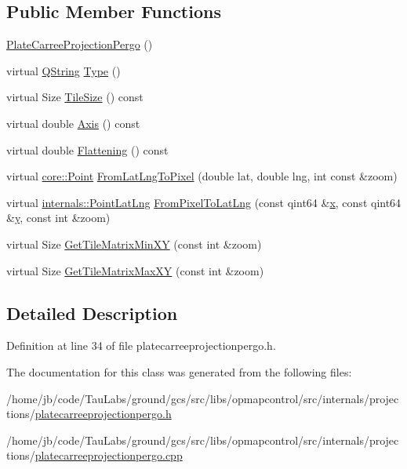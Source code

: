 \subsection*{\-Public \-Member \-Functions}
\begin{DoxyCompactItemize}
\item 
\hyperlink{group___o_p_map_widget_ga9efefe0ffe073b3074b5ada1a6f0f267}{\-Plate\-Carree\-Projection\-Pergo} ()
\item 
virtual \hyperlink{group___u_a_v_objects_plugin_gab9d252f49c333c94a72f97ce3105a32d}{\-Q\-String} \hyperlink{group___o_p_map_widget_ga0c0b83ba2e36423002e0561797a75d6f}{\-Type} ()
\item 
virtual \-Size \hyperlink{group___o_p_map_widget_ga459271797b70ca4aacc1bc616c8588e1}{\-Tile\-Size} () const 
\item 
virtual double \hyperlink{group___o_p_map_widget_ga189bc30528175596e1010dae2d199d1d}{\-Axis} () const 
\item 
virtual double \hyperlink{group___o_p_map_widget_ga03c9086ef72e6a349a5ab125cfd6533e}{\-Flattening} () const 
\item 
virtual \hyperlink{structcore_1_1_point}{core\-::\-Point} \hyperlink{group___o_p_map_widget_gaf785f752ac316a8cb94c96dacabdc244}{\-From\-Lat\-Lng\-To\-Pixel} (double lat, double lng, int const \&zoom)
\item 
virtual \hyperlink{structinternals_1_1_point_lat_lng}{internals\-::\-Point\-Lat\-Lng} \hyperlink{group___o_p_map_widget_ga3bd1d9693dd54a69baa88bed4785311d}{\-From\-Pixel\-To\-Lat\-Lng} (const qint64 \&\hyperlink{_o_p_plots_8m_a9336ebf25087d91c818ee6e9ec29f8c1}{x}, const qint64 \&\hyperlink{_o_p_plots_8m_a2fb1c5cf58867b5bbc9a1b145a86f3a0}{y}, const int \&zoom)
\item 
virtual \-Size \hyperlink{group___o_p_map_widget_ga95a4e9e98cce1bb7cc3d4afb9e30f1b7}{\-Get\-Tile\-Matrix\-Min\-X\-Y} (const int \&zoom)
\item 
virtual \-Size \hyperlink{group___o_p_map_widget_gabf54183dc66f5385ffa794ce7120629c}{\-Get\-Tile\-Matrix\-Max\-X\-Y} (const int \&zoom)
\end{DoxyCompactItemize}


\subsection{\-Detailed \-Description}


\-Definition at line 34 of file platecarreeprojectionpergo.\-h.



\-The documentation for this class was generated from the following files\-:\begin{DoxyCompactItemize}
\item 
/home/jb/code/\-Tau\-Labs/ground/gcs/src/libs/opmapcontrol/src/internals/projections/\hyperlink{platecarreeprojectionpergo_8h}{platecarreeprojectionpergo.\-h}\item 
/home/jb/code/\-Tau\-Labs/ground/gcs/src/libs/opmapcontrol/src/internals/projections/\hyperlink{platecarreeprojectionpergo_8cpp}{platecarreeprojectionpergo.\-cpp}\end{DoxyCompactItemize}
